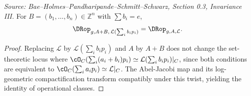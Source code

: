 \begin{lemma}
  \label{lem:invariance_weight_translation}
  \textit{Source: Bae--Holmes--Pandharipande--Schmitt--Schwarz, Section 0.3, Invariance III.}
  For $B = (b_1,\ldots,b_n) \in \mathbb{Z}^n$ with $\sum b_i = e$,
  \[
    \DRop_{g,A+B,\,\mathcal{L}(\sum_i b_i p_i)} = \DRop_{g,A,\mathcal{L}}.
  \]
\end{lemma}

\begin{proof}
  Replacing $\mathcal{L}$ by $\mathcal{L}(\sum_i b_i p_i)$ and $A$ by $A+B$ does not
  change the set-theoretic locus where $\cO_C(\sum_i(a_i+b_i)p_i)\simeq\mathcal{L}(\sum_i b_i p_i)|_C$,
  since both conditions are equivalent to $\cO_C(\sum_i a_i p_i)\simeq\mathcal{L}|_C$.
  The Abel-Jacobi map and its log-geometric compactification transform compatibly under
  this twist, yielding the identity of operational classes.
\end{proof}

